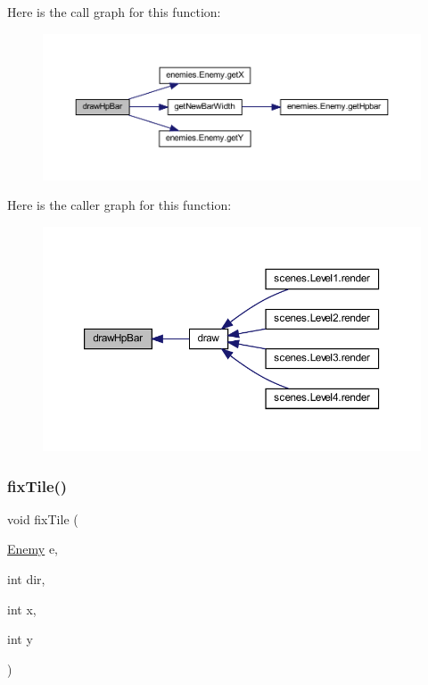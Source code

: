 Here is the call graph for this function\+:
\nopagebreak
\begin{figure}[H]
\begin{center}
\leavevmode
\includegraphics[width=350pt]{classmanagers_1_1_enemy_manager_a9c98cd29298e5f583c52dc46a6d70d46_cgraph}
\end{center}
\end{figure}
Here is the caller graph for this function\+:
\nopagebreak
\begin{figure}[H]
\begin{center}
\leavevmode
\includegraphics[width=350pt]{classmanagers_1_1_enemy_manager_a9c98cd29298e5f583c52dc46a6d70d46_icgraph}
\end{center}
\end{figure}
\mbox{\label{classmanagers_1_1_enemy_manager_a01056d4d58ff52ab419ad8924922132d}} 
\subsubsection{\texorpdfstring{fix\+Tile()}{fixTile()}}
{\footnotesize\ttfamily void fix\+Tile (\begin{DoxyParamCaption}\item[{\hyperlink{classenemies_1_1_enemy}{Enemy}}]{e,  }\item[{int}]{dir,  }\item[{int}]{x,  }\item[{int}]{y }\end{DoxyParamCaption})}



